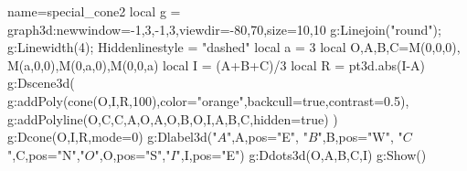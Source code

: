 \documentclass[12pt]{standalone}
\begin{document}
\begin{luadraw}{name=special_cone2}
local g = graph3d:new{window={-1,3,-1,3},viewdir={-80,70},size={10,10}}
g:Linejoin("round"); g:Linewidth(4); Hiddenlinestyle = "dashed"
local a = 3
local O,A,B,C=M(0,0,0), M(a,0,0),M(0,a,0),M(0,0,a)
local I = (A+B+C)/3
local R = pt3d.abs(I-A)
g:Dscene3d(
    g:addPoly(cone(O,I,R,100),{color="orange",backcull=true,contrast=0.5}),
    g:addPolyline({{O,C},{C,A},{O,A},{O,B},{O,I},{A,B,C}},{hidden=true})
)
g:Dcone(O,I,R,{mode=0}) 
g:Dlabel3d("$A$",A,{pos="E"}, "$B$",B,{pos="W"}, "$C$",C,{pos="N"},"$O$",O,{pos="S"},"$I$",I,{pos="E"})
g:Ddots3d({O,A,B,C,I})
g:Show()
\end{luadraw}
\end{document}
